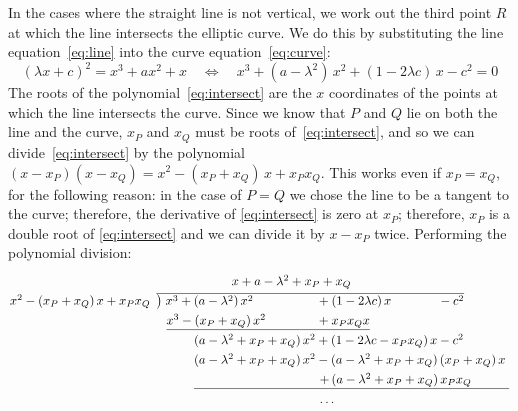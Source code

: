 \documentclass{article}
\begin{document}
In the cases where the straight line is not vertical, we work out the third point $R$ at which the line intersects the elliptic curve.
We do this by substituting the line equation~\eqref{eq:line} into the curve equation~\eqref{eq:curve}:
\begin{equation}
(\lambda x + c)^2 = x^3 + ax^2 + x \quad\iff\quad x^3 + (a - \lambda^2)\, x^2 + (1 - 2\lambda c)\, x - c^2 = 0 \label{eq:intersect}
\end{equation}
The roots of the polynomial~\eqref{eq:intersect} are the $x$ coordinates of the points at which the line intersects the curve.
Since we know that $P$ and $Q$ lie on both the line and the curve, $x_P$ and $x_Q$ must be roots of~\eqref{eq:intersect}, and so we can divide~\eqref{eq:intersect} by the polynomial $(x - x_P)(x - x_Q) = x^2 - (x_P + x_Q)\,x + x_P x_Q$.
This works even if $x_P=x_Q$, for the following reason: in the case of $P=Q$ we chose the line to be a tangent to the curve; therefore, the derivative of \eqref{eq:intersect} is zero at $x_P$; therefore, $x_P$ is a double root of \eqref{eq:intersect} and we can divide it by $x - x_P$ twice.
Performing the polynomial division:
\begin{equation*}\arraycolsep=1pt\def\arraystretch{1.3}
\begin{array}{ll}
& \hspace{60pt} x + a - \lambda^2 + x_P + x_Q \\
x^2 - (x_P + x_Q)\,x + x_P x_Q \;&
\overline{\smash{\big)}\; x^3 + (a - \lambda^2)\, x^2 \hspace{50pt} + (1 - 2\lambda c)\, x \hspace{37pt} - c^2} \\
& \hspace{8pt}\underline{x^3 - (x_P + x_Q)\, x^2 \hspace{40pt} + x_P x_Q x} \\
& \hspace{30pt}(a - \lambda^2 + x_P + x_Q)\, x^2 + (1 - 2\lambda c - x_P x_Q)\, x - c^2 \\
& \hspace{30pt}(a - \lambda^2 + x_P + x_Q)\, x^2 - (a - \lambda^2 + x_P + x_Q)\,(x_P + x_Q)\, x \\
& \hspace{30pt}\underline{\hspace{100pt} +\, (a - \lambda^2 + x_P + x_Q)\,x_P x_Q \hspace{30pt}} \\
& \hspace{130pt}\dots
\end{array}
\end{equation*}
\end{document}
